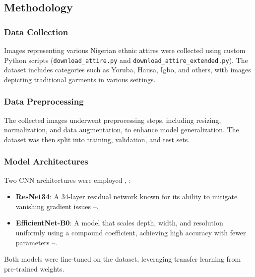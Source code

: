 \documentclass[
  journal,
]{IEEEtran}%
\begin{document}
\subsection{Methodology}\label{methodology}

\subsubsection{Data Collection}\label{data-collection}

Images representing various Nigerian ethnic attires were collected using
custom Python scripts (\texttt{download\_attire.py} and
\texttt{download\_attire\_extended.py}). The dataset includes categories
such as Yoruba, Hausa, Igbo, and others, with images depicting
traditional garments in various settings.

\subsubsection{Data Preprocessing}\label{data-preprocessing}

The collected images underwent preprocessing steps, including resizing,
normalization, and data augmentation, to enhance model generalization.
The dataset was then split into training, validation, and test sets.

\subsubsection{Model Architectures}\label{model-architectures}

Two CNN architectures were employed
,
:

\begin{itemize}
\item
  \textbf{ResNet34}: A 34-layer residual network known for its ability
  to mitigate vanishing gradient issues
  --.
\item
  \textbf{EfficientNet-B0}: A model that scales depth, width, and
  resolution uniformly using a compound coefficient, achieving high
  accuracy with fewer parameters
  --.
\end{itemize}

Both models were fine-tuned on the dataset, leveraging transfer learning
from pre-trained weights.
\end{document}
